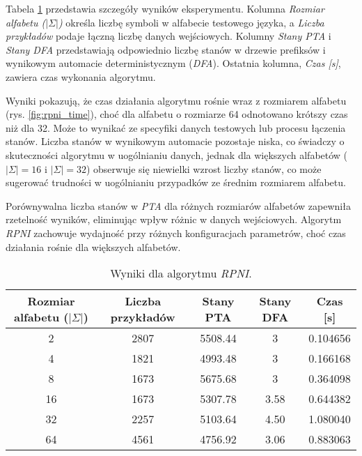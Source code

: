 Tabela \ref{tab:rpni_results} przedstawia szczegóły wyników eksperymentu. Kolumna \textit{Rozmiar alfabetu (\(|\Sigma|\))} określa liczbę symboli w alfabecie testowego języka, a \textit{Liczba przykładów} podaje łączną liczbę danych wejściowych. Kolumny \textit{Stany PTA} i \textit{Stany DFA} przedstawiają odpowiednio liczbę stanów w drzewie prefiksów i wynikowym automacie deterministycznym (\textit{DFA}). Ostatnia kolumna, \textit{Czas [s]}, zawiera czas wykonania algorytmu.  

Wyniki pokazują, że czas działania algorytmu rośnie wraz z rozmiarem alfabetu (rys. \ref{fig:rpni_time}), choć dla alfabetu o rozmiarze 64 odnotowano krótszy czas niż dla 32. Może to wynikać ze specyfiki danych testowych lub procesu łączenia stanów. Liczba stanów w wynikowym automacie pozostaje niska, co świadczy o skuteczności algorytmu w uogólnianiu danych, jednak dla większych alfabetów (\(|\Sigma| = 16\) i \(|\Sigma| = 32\)) obserwuje się niewielki wzrost liczby stanów, co może sugerować trudności w uogólnianiu przypadków ze średnim rozmiarem alfabetu.  

Porównywalna liczba stanów w \textit{PTA} dla różnych rozmiarów alfabetów zapewniła rzetelność wyników, eliminując wpływ różnic w danych wejściowych. Algorytm \textit{RPNI} zachowuje wydajność przy różnych konfiguracjach parametrów, choć czas działania rośnie dla większych alfabetów.

\begin{table}[h]
\centering
\caption{Wyniki dla algorytmu \textit{RPNI}.}
\label{tab:rpni_results}
\begin{tabular}{|c|c|c|c|c|}
\hline
Rozmiar alfabetu (\(|\Sigma|\)) & Liczba przykładów & Stany PTA & Stany DFA & Czas [s] \\ \hline
2                               & 2807              & 5508.44   & 3         & 0.104656 \\ \hline
4                               & 1821              & 4993.48   & 3         & 0.166168 \\ \hline
8                               & 1673              & 5675.68   & 3         & 0.364098 \\ \hline
16                              & 1673              & 5307.78   & 3.58      & 0.644382 \\ \hline
32                              & 2257              & 5103.64   & 4.50      & 1.080040 \\ \hline
64                              & 4561              & 4756.92   & 3.06      & 0.883063 \\ \hline
\end{tabular}
\end{table}

